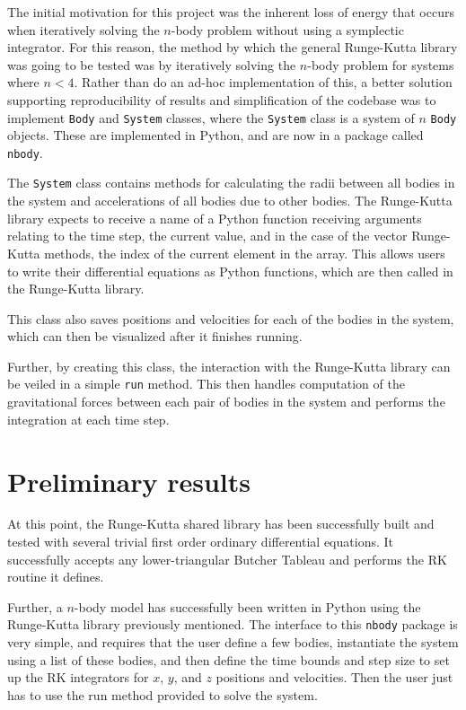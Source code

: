 \documentclass[onecolumn,titlepage,letterpaper,10pt]{article}
\begin{document}
The initial motivation for this project was the inherent loss of energy that
occurs when iteratively solving the $n$-body problem without using a symplectic
integrator. For this reason, the method by which the general Runge-Kutta
library was going to be tested was by iteratively solving the $n$-body
problem for systems where $n < 4$. Rather than do an ad-hoc implementation of
this, a better solution supporting reproducibility of results and
simplification of the codebase was to implement \texttt{Body} and
\texttt{System} classes, where the \texttt{System} class is a system of $n$
\texttt{Body} objects. These are implemented in Python, and are now in a package
called \texttt{nbody}.

The \texttt{System} class contains methods for calculating the radii between all
bodies in the system and accelerations of all bodies due to other bodies.
The Runge-Kutta library expects to receive a name of a Python function receiving
arguments relating to the time step, the current value, and in the case of the
vector Runge-Kutta methods, the index of the current element in the array. This
allows users to write their differential equations as Python functions, which
are then called in the Runge-Kutta library.

This class also saves positions and velocities for each of the bodies in the
system, which can then be visualized after it finishes running.

Further, by creating this class, the interaction with the Runge-Kutta library
can be veiled in a simple \texttt{run} method. This then handles computation of
the gravitational forces between each pair of bodies in the system and performs
the integration at each time step.

\section{Preliminary results}
At this point, the Runge-Kutta shared library has been successfully built and
tested with several trivial first order ordinary differential equations. It
successfully accepts any lower-triangular Butcher Tableau and performs the RK
routine it defines.

Further, a $n$-body model has successfully been written in Python using the
Runge-Kutta library previously mentioned. The interface to this \texttt{nbody}
package is very simple, and requires that the user define a few bodies,
instantiate the system using a list of these bodies, and then define the
time bounds and step size to set up the RK integrators for $x$, $y$, and $z$
positions and velocities. Then the user just has to use the run method provided
to solve the system.
\end{document}
